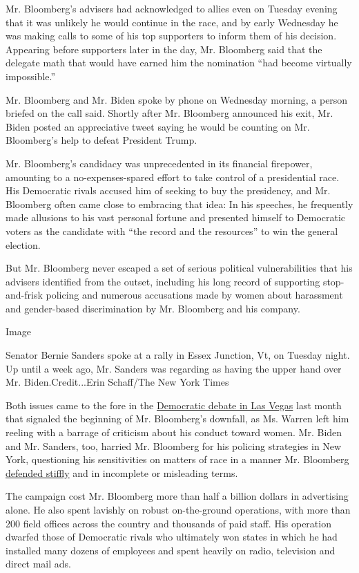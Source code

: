 Mr. Bloomberg's advisers had acknowledged to allies even on Tuesday
evening that it was unlikely he would continue in the race, and by early
Wednesday he was making calls to some of his top supporters to inform
them of his decision. Appearing before supporters later in the day, Mr.
Bloomberg said that the delegate math that would have earned him the
nomination ``had become virtually impossible.''

Mr. Bloomberg and Mr. Biden spoke by phone on Wednesday morning, a
person briefed on the call said. Shortly after Mr. Bloomberg announced
his exit, Mr. Biden posted an appreciative tweet saying he would be
counting on Mr. Bloomberg's help to defeat President Trump.

Mr. Bloomberg's candidacy was unprecedented in its financial firepower,
amounting to a no-expenses-spared effort to take control of a
presidential race. His Democratic rivals accused him of seeking to buy
the presidency, and Mr. Bloomberg often came close to embracing that
idea: In his speeches, he frequently made allusions to his vast personal
fortune and presented himself to Democratic voters as the candidate with
``the record and the resources'' to win the general election.

But Mr. Bloomberg never escaped a set of serious political
vulnerabilities that his advisers identified from the outset, including
his long record of supporting stop-and-frisk policing and numerous
accusations made by women about harassment and gender-based
discrimination by Mr. Bloomberg and his company.

Image

Senator Bernie Sanders spoke at a rally in Essex Junction, Vt, on
Tuesday night. Up until a week ago, Mr. Sanders was regarding as having
the upper hand over Mr. Biden.Credit...Erin Schaff/The New York Times

Both issues came to the fore in the
\href{https://www.nytimes.com/2020/02/20/us/politics/democratic-debate-las-vegas.html}{Democratic
debate in Las Vegas} last month that signaled the beginning of Mr.
Bloomberg's downfall, as Ms. Warren left him reeling with a barrage of
criticism about his conduct toward women. Mr. Biden and Mr. Sanders,
too, harried Mr. Bloomberg for his policing strategies in New York,
questioning his sensitivities on matters of race in a manner Mr.
Bloomberg
\href{https://www.nytimes.com/2020/02/20/us/politics/bloomberg-nevada-debate.html}{defended
stiffly} and in incomplete or misleading terms.

The campaign cost Mr. Bloomberg more than half a billion dollars in
advertising alone. He also spent lavishly on robust on-the-ground
operations, with more than 200 field offices across the country and
thousands of paid staff. His operation dwarfed those of Democratic
rivals who ultimately won states in which he had installed many dozens
of employees and spent heavily on radio, television and direct mail ads.


